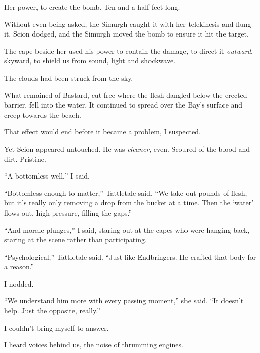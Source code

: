 Her power, to create the bomb.  Ten and a half feet long.



Without even being asked, the Simurgh caught it with her telekinesis and flung it.  Scion dodged, and the Simurgh moved the bomb to ensure it hit the target.



The cape beside her used his power to contain the damage, to direct it \emph{outward}, skyward, to shield us from sound, light and shockwave.



The clouds had been struck from the sky.



What remained of Bastard, cut free where the flesh dangled below the erected barrier, fell into the water.   It continued to spread over the Bay's surface and creep towards the beach.



That effect would end before it became a problem, I suspected.



Yet Scion appeared untouched.  He was \emph{cleaner}, even.  Scoured of the blood and dirt.  Pristine.



``A bottomless well,'' I said.



``Bottomless enough to matter,'' Tattletale said.  ``We take out pounds of flesh, but it's really only removing a drop from the bucket at a time.  Then the `water' flows out, high pressure, filling the gaps.''



``And morale plunges,'' I said, staring out at the capes who were hanging back, staring at the scene rather than participating.



``Psychological,'' Tattletale said.  ``Just like Endbringers.  He crafted that body for a reason.''



I nodded.



``We understand him more with every passing moment,'' she said.  ``It doesn't help.  Just the opposite, really.''



I couldn't bring myself to answer.



I heard voices behind us, the noise of thrumming engines.



